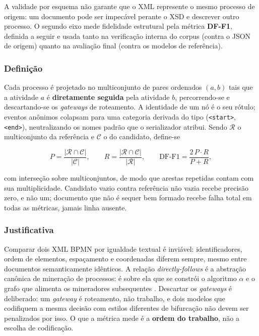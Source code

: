 A validade por esquema não garante que o XML represente o mesmo processo de origem: um documento pode ser impecável perante o XSD e descrever outro processo. O segundo eixo mede fidelidade estrutural pela métrica \textbf{DF-F1}, definida a seguir e usada tanto na verificação interna do corpus (contra o JSON de origem) quanto na avaliação final (contra os modelos de referência).

\subsubsection*{Definição}

Cada processo é projetado no multiconjunto de pares ordenados $(a,b)$ tais que a atividade $a$ é \textbf{diretamente seguida} pela atividade $b$, percorrendo-se e descartando-se os \textit{gateways} de roteamento. A identidade de um nó é o seu rótulo; eventos anônimos colapsam para uma categoria derivada do tipo (\texttt{<start>}, \texttt{<end>}), neutralizando os nomes padrão que o serializador atribui. Sendo $\mathcal{R}$ o multiconjunto da referência e $\mathcal{C}$ o do candidato, define-se

\begin{equation}
	P = \frac{|\mathcal{R} \cap \mathcal{C}|}{|\mathcal{C}|}, \qquad
	R = \frac{|\mathcal{R} \cap \mathcal{C}|}{|\mathcal{R}|}, \qquad
	\text{DF-F1} = \frac{2\,P \cdot R}{P + R},
\end{equation}

\noindent com interseção sobre multiconjuntos, de modo que arestas repetidas contam com sua multiplicidade. Candidato vazio contra referência não vazia recebe precisão zero, e não um; documento que não é sequer bem formado recebe falha total em todas as métricas, jamais linha ausente.

\subsubsection*{Justificativa}

Comparar dois XML BPMN por igualdade textual é inviável: identificadores, ordem de elementos, espaçamento e coordenadas diferem sempre, mesmo entre documentos semanticamente idênticos. A relação \textit{directly-follows} é a abstração canônica de mineração de processos: é sobre ela que se constrói o algoritmo $\alpha$ \cite{vanderaalst2004alpha} e o grafo que alimenta os mineradores subsequentes \cite{vanderaalst2016processmining}. Descartar os \textit{gateways} é deliberado: um \textit{gateway} é roteamento, não trabalho, e dois modelos que codifiquem a mesma decisão com estilos diferentes de bifurcação não devem ser penalizados por isso. O que a métrica mede é a \textbf{ordem do trabalho}, não a escolha de codificação.

